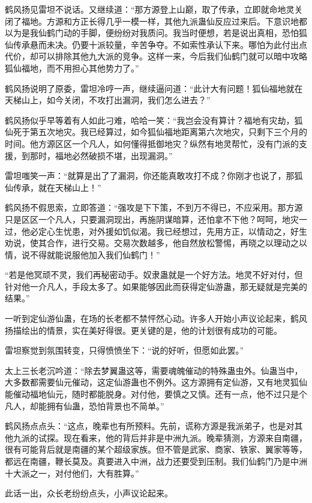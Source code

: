 \begin{this_body}
鹤风扬见雷坦不说话。又继续道：“那方源登上山巅，取了传承，立即就命地灵关闭了福地。方源和方正长得几乎一模一样，其他九派蛊仙反应过来后。下意识地都以为是我仙鹤门动的手脚，便纷纷对我质问。我当时便想，若是说出真相，恐怕狐仙传承悬而未决。仍要十派较量，辛苦争夺。不如索性承认下来。哪怕为此付出点代价，却可以排除其他九大派的竞争。这样一来，今后我们仙鹤门就可以暗中攻略狐仙福地，而不用担心其他势力了。”

鹤风扬说明了原委，雷坦冷哼一声，继续逼问道：“此计大有问题！狐仙福地就在天梯山上，如今关闭，不攻打出漏洞，我们怎么进去？”

鹤风扬似乎早等着有人如此刁难，哈哈一笑：“我岂会没有算计？福地有灾劫，狐仙死于第五次地灾。我已经算过，如今狐仙福地距离第六次地灾，只剩下三个月的时间。他方源区区一个凡人，如何懂得抵御地灾？纵然有地灵帮忙，没有门派的支援，到那时，福地必然破损不堪，出现漏洞。”

雷坦嗤笑一声：“就算是出了了漏洞，你还能真敢攻打不成？你刚才也说了，那狐仙传承，就在天梯山上！”

鹤风扬不假思索，立即答道：“强攻是下下策，不到万不得已，不应采用。那方源只是区区一个凡人，只要漏洞现出，再施阴谋暗算，还怕拿不下他？呵呵，地灾一过，他必定心生忧患，对外援如饥似渴。我已经想过，先用方正，以情动之，好生劝说，使其合作，进行交易。交易次数越多，他自然放松警惕，再晓之以理动之以情，说不得就能说服他加入我们仙鹤门！”

“若是他冥顽不灵，我们再秘密动手。奴隶蛊就是一个好方法。地灵不好对付，但针对他一介凡人，手段太多了。如果能够因此而获得定仙游蛊，那无疑就是完美的结果。”

一听到定仙游仙蛊，在场的长老都不禁怦然心动。许多人开始小声议论起来，鹤风扬描绘出的情景，实在美好得很。更关键的是，他的计划很有成功的可能。

雷坦察觉到氛围转变，只得愤愤坐下：“说的好听，但愿如此罢。”

太上三长老沉吟道：“除去梦翼蛊这等，需要魂魄催动的特殊蛊虫外。仙蛊当中，大多数都需要仙元催动，这定仙游蛊也不例外。这方源拥有定仙游，又有地灵狐仙能催动福地仙元，随时都能脱身。对付他，要慎之又慎。还有一点，他不过只是个凡人，却能拥有仙蛊，恐怕背景也不简单。”

鹤风扬点点头：“这点，晚辈也有所预料。先前，谎称方源是我派弟子，也是对其他九派的试探。现在看来，他的背后并非是中洲九派。晚辈猜测，方源来自南疆，很有可能背后就是南疆的某个超级家族。但不管是武家、商家、铁家、翼家等等，都远在南疆，鞭长莫及。真要进入中洲，战力还要受到压制。我们仙鹤门乃是中洲十大派之一，对付他们，大有胜算。”

此话一出，众长老纷纷点头，小声议论起来。


\end{this_body}
